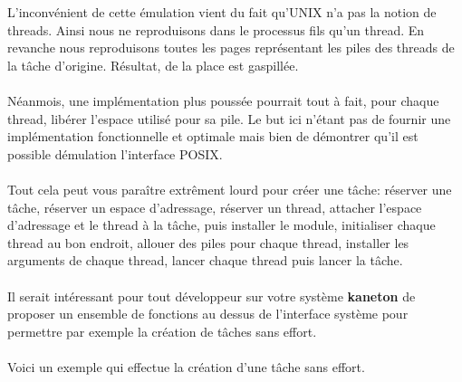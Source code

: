 \documentclass[10pt,a4wide]{article}
\begin{document}
L'inconv\'enient de cette \'emulation vient du fait qu'UNIX n'a pas
la notion de threads. Ainsi nous ne reproduisons dans le processus
fils qu'un thread. En revanche nous reproduisons toutes les pages
repr\'esentant les piles des threads de la t\^ache d'origine. R\'esultat,
de la place est gaspill\'ee.

\paragraph{}

N\'eanmois, une impl\'ementation plus pouss\'ee pourrait tout \`a fait,
pour chaque thread, lib\'erer l'espace utilis\'e pour sa pile. Le but
ici n'\'etant pas de fournir une impl\'ementation fonctionnelle et optimale
mais bien de d\'emontrer qu'il est possible d\'emulation l'interface POSIX.

\paragraph{}

Tout cela peut vous para\^itre extr\^ement lourd pour cr\'eer une t\^ache:
r\'eserver une t\^ache, r\'eserver un espace d'adressage, r\'eserver
un thread, attacher l'espace d'adressage et le thread \`a la t\^ache, puis
installer le module, initialiser chaque thread au bon endroit, allouer des
piles pour chaque thread, installer les arguments de chaque thread,
lancer chaque thread puis lancer la t\^ache.

\paragraph{}

Il serait int\'eressant pour tout d\'eveloppeur sur votre syst\`eme
\textbf{kaneton} de proposer un ensemble de fonctions au dessus de
l'interface syst\`eme pour permettre par exemple la cr\'eation de t\^aches
sans effort.

\paragraph{}

Voici un exemple qui effectue la cr\'eation d'une t\^ache sans effort.
\end{document}
